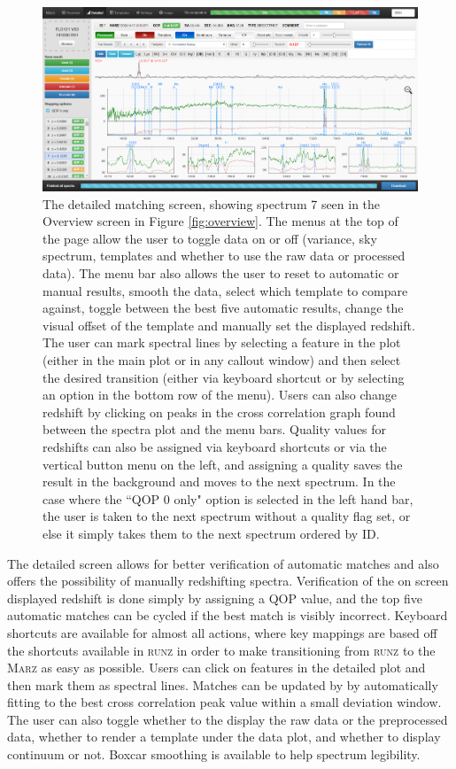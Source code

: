 \documentclass[iop]{emulateapj}
\newcommand{\runz}{\textsc{runz}}
\newcommand{\marz}{\textsc{Marz}}
\begin{document}
\begin{figure}[H]
\centering
\includegraphics[width=\textwidth]{InterfaceZ2.png}
\caption{The detailed matching screen, showing spectrum 7 seen in the Overview screen in Figure \ref{fig:overview}. The menus at the top of the page allow the user to toggle data on or off (variance, sky spectrum, templates and whether to use the raw data or processed data). The menu bar also allows the user to reset to automatic or manual results, smooth the data, select which template to compare against, toggle between the best five automatic results, change the visual offset of the template and manually set the displayed redshift. The user can mark spectral lines by selecting a feature in the plot (either in the main plot or in any callout window) and then select the desired transition (either via keyboard shortcut or by selecting an option in the bottom row of the menu). Users can also change redshift by clicking on peaks in the cross correlation graph found between the spectra plot and the menu bars. Quality values for redshifts can also be assigned via keyboard shortcuts or via the vertical button menu on the left, and assigning a quality saves the result in the background and moves to the next spectrum. In the case where the ``QOP 0 only" option is selected in the left hand bar, the user is taken to the next spectrum without a quality flag set, or else it simply takes them to the next spectrum ordered by ID.}
\label{fig:detailed}
\end{figure}

The detailed screen allows for better verification of automatic matches and also offers the possibility of manually redshifting spectra. Verification of the on screen displayed redshift is done simply by assigning a QOP value, and the top five automatic matches can be cycled if the best match is visibly incorrect. Keyboard shortcuts are available for almost all actions, where key mappings are based off the shortcuts available in \runz{} in order to make transitioning from \runz{} to the \marz{} as easy as possible. Users can click on features in the detailed plot and then mark them as spectral lines. Matches can be updated by by automatically fitting to the best cross correlation peak value within a small deviation window. The user can also toggle whether to the display the raw data or the preprocessed data, whether to render a template under the data plot, and whether to display continuum or not. Boxcar smoothing is available to help spectrum legibility.\\
\end{document}
